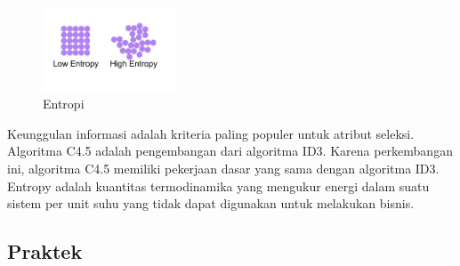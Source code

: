\begin{enumerate}
	\hfill\break
	\begin{figure}[H]
		\includegraphics[width=4cm]{figures/1174027/2/entropi.jpg}
		\centering
		\caption{Entropi}
	\end{figure}
	\hfill\break
	Keunggulan informasi adalah kriteria paling populer untuk atribut seleksi. Algoritma C4.5 adalah pengembangan dari algoritma ID3. 
	Karena perkembangan ini, algoritma C4.5 memiliki pekerjaan dasar yang sama dengan algoritma ID3.
	Entropy adalah kuantitas termodinamika yang mengukur energi dalam suatu sistem per unit suhu yang tidak dapat digunakan untuk melakukan bisnis.
\end{enumerate}
\subsection{Praktek}

